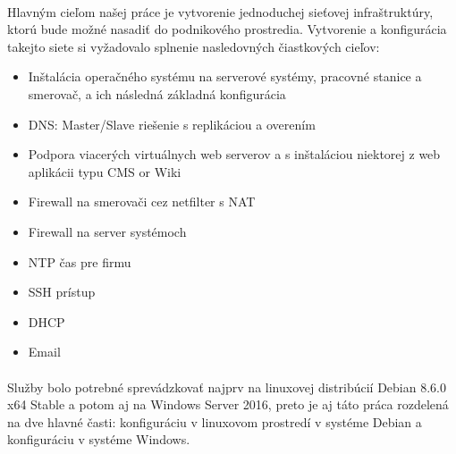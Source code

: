\paragraph{}
Hlavným cieľom našej práce je vytvorenie jednoduchej sieťovej infraštruktúry, ktorú bude možné nasadiť do podnikového prostredia. Vytvorenie a konfigurácia takejto siete si vyžadovalo splnenie nasledovných čiastkových cieľov:
\begin{itemize}
\item Inštalácia operačného systému na serverové systémy, pracovné stanice a smerovač, a ich následná základná konfigurácia
\item DNS: Master/Slave riešenie s replikáciou a overením
\item Podpora viacerých virtuálnych web serverov a s inštaláciou niektorej z web aplikácii typu CMS or Wiki
\item Firewall na smerovači cez  netfilter s NAT
\item Firewall na server systémoch
\item NTP čas pre firmu
\item SSH prístup
\item DHCP
\item Email
\end{itemize}
\paragraph{}
Služby bolo potrebné sprevádzkovať najprv na linuxovej distribúcií Debian 8.6.0 x64 Stable a potom aj na Windows Server 2016, preto je aj táto práca rozdelená na dve hlavné časti: konfiguráciu v linuxovom prostredí v systéme Debian a konfiguráciu v systéme Windows.
